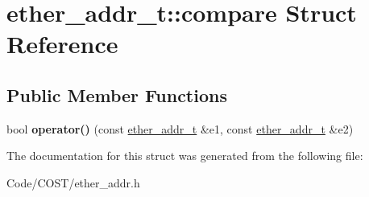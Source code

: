 \hypertarget{structether__addr__t_1_1compare}{}\section{ether\+\_\+addr\+\_\+t\+:\+:compare Struct Reference}
\label{structether__addr__t_1_1compare}
\subsection*{Public Member Functions}
\begin{DoxyCompactItemize}
\item 
\mbox{\label{structether__addr__t_1_1compare_a5d406d61bb2102903fc8ed7d56fb9c96}} 
bool {\bfseries operator()} (const \hyperlink{classether__addr__t}{ether\+\_\+addr\+\_\+t} \&e1, const \hyperlink{classether__addr__t}{ether\+\_\+addr\+\_\+t} \&e2)
\end{DoxyCompactItemize}


The documentation for this struct was generated from the following file\+:\begin{DoxyCompactItemize}
\item 
Code/\+C\+O\+S\+T/ether\+\_\+addr.\+h\end{DoxyCompactItemize}
